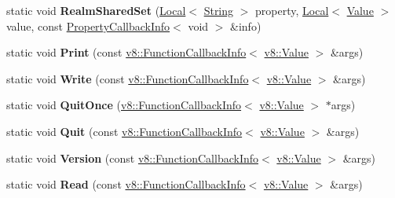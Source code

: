 \begin{DoxyCompactItemize}
\item 
static void {\bfseries Realm\+Shared\+Set} (\hyperlink{classv8_1_1_local}{Local}$<$ \hyperlink{classv8_1_1_string}{String} $>$ property, \hyperlink{classv8_1_1_local}{Local}$<$ \hyperlink{classv8_1_1_value}{Value} $>$ value, const \hyperlink{classv8_1_1_property_callback_info}{Property\+Callback\+Info}$<$ void $>$ \&info)\hypertarget{classv8_1_1_shell_a88d66b6299a850963f0fc2226e19c157}{}\label{classv8_1_1_shell_a88d66b6299a850963f0fc2226e19c157}

\item 
static void {\bfseries Print} (const \hyperlink{classv8_1_1_function_callback_info}{v8\+::\+Function\+Callback\+Info}$<$ \hyperlink{classv8_1_1_value}{v8\+::\+Value} $>$ \&args)\hypertarget{classv8_1_1_shell_a7b8bdce48fa4a1b5e9ce8df50fc0a655}{}\label{classv8_1_1_shell_a7b8bdce48fa4a1b5e9ce8df50fc0a655}

\item 
static void {\bfseries Write} (const \hyperlink{classv8_1_1_function_callback_info}{v8\+::\+Function\+Callback\+Info}$<$ \hyperlink{classv8_1_1_value}{v8\+::\+Value} $>$ \&args)\hypertarget{classv8_1_1_shell_afd3888490889c1e9be9599cf4a2bad4f}{}\label{classv8_1_1_shell_afd3888490889c1e9be9599cf4a2bad4f}

\item 
static void {\bfseries Quit\+Once} (\hyperlink{classv8_1_1_function_callback_info}{v8\+::\+Function\+Callback\+Info}$<$ \hyperlink{classv8_1_1_value}{v8\+::\+Value} $>$ $\ast$args)\hypertarget{classv8_1_1_shell_ae7ab8288337d8e4ef62c9e8b65c5138e}{}\label{classv8_1_1_shell_ae7ab8288337d8e4ef62c9e8b65c5138e}

\item 
static void {\bfseries Quit} (const \hyperlink{classv8_1_1_function_callback_info}{v8\+::\+Function\+Callback\+Info}$<$ \hyperlink{classv8_1_1_value}{v8\+::\+Value} $>$ \&args)\hypertarget{classv8_1_1_shell_a0ba86babc520a8e061820fab8fbccbbb}{}\label{classv8_1_1_shell_a0ba86babc520a8e061820fab8fbccbbb}

\item 
static void {\bfseries Version} (const \hyperlink{classv8_1_1_function_callback_info}{v8\+::\+Function\+Callback\+Info}$<$ \hyperlink{classv8_1_1_value}{v8\+::\+Value} $>$ \&args)\hypertarget{classv8_1_1_shell_a67d9a8c0c96e9cf9a6bb22703ad019e7}{}\label{classv8_1_1_shell_a67d9a8c0c96e9cf9a6bb22703ad019e7}

\item 
static void {\bfseries Read} (const \hyperlink{classv8_1_1_function_callback_info}{v8\+::\+Function\+Callback\+Info}$<$ \hyperlink{classv8_1_1_value}{v8\+::\+Value} $>$ \&args)\hypertarget{classv8_1_1_shell_a05de5538b7e495ce8402923d15b16512}{}\label{classv8_1_1_shell_a05de5538b7e495ce8402923d15b16512}


\end{DoxyCompactItemize}
